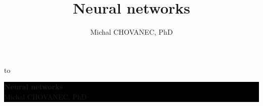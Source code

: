 \documentclass[xcolor=dvipsnames]{beamer}
\title{\color{white} \bf Neural networks}
\author{\color{white} Michal CHOVANEC, PhD}
\date[EURP]{}
\begin{document}
{
    \usebackgroundtemplate
    {
        \vbox to 
    }
    \begin{frame}



    \centering
     \colorbox{black}
     {
        \begin{minipage}{7cm}
           {\LARGE \color{white} \bf Neural networks} \\
           {\LARGE \color{white} Michal CHOVANEC, PhD} \\
       \end{minipage}
     }


    \end{frame}
}
\end{document}
